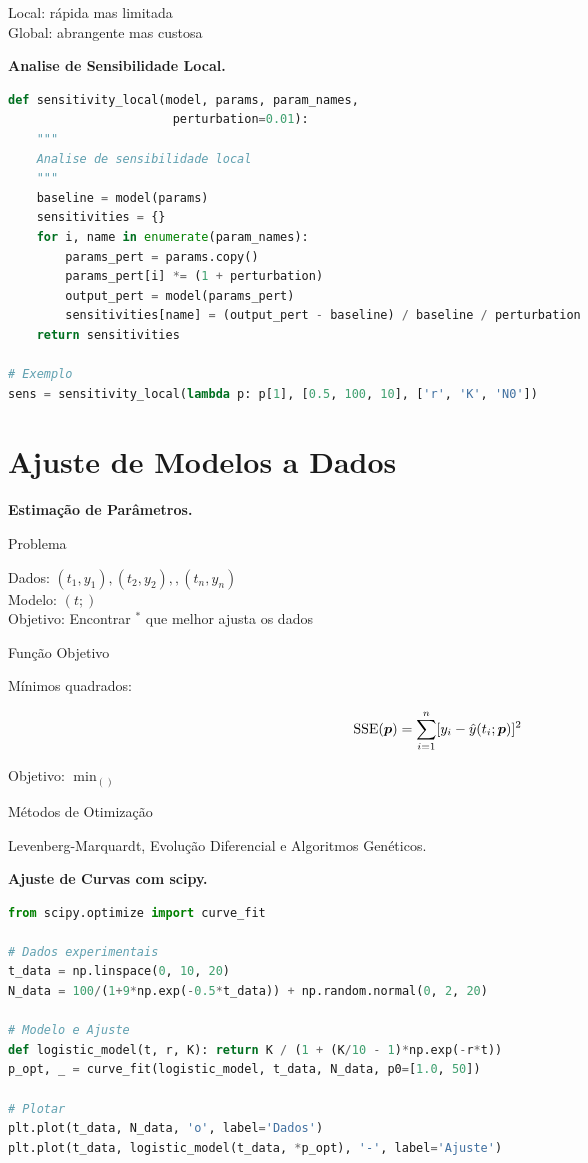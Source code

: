 Local: rápida mas limitada \\

Global: abrangente mas custosa

\textbf{Analise de Sensibilidade Local.}

%
\begin{lstlisting}[language=Python, caption=Sensibilidade por diferenças finitas, basicstyle=\ttfamily\footnotesize]
def sensitivity_local(model, params, param_names,
                       perturbation=0.01):
    """
    Analise de sensibilidade local
    """
    baseline = model(params)
    sensitivities = {}
    for i, name in enumerate(param_names):
        params_pert = params.copy()
        params_pert[i] *= (1 + perturbation)
        output_pert = model(params_pert)
        sensitivities[name] = (output_pert - baseline) / baseline / perturbation
    return sensitivities

# Exemplo
sens = sensitivity_local(lambda p: p[1], [0.5, 100, 10], ['r', 'K', 'N0'])
\end{lstlisting}
%

\section{Ajuste de Modelos a Dados}

\textbf{Estimação de Parâmetros.}

Problema

Dados: $(t_1, y_1), (t_2, y_2), , (t_n, y_n)$\\

Modelo: $(t; )$\\

Objetivo: Encontrar $^*$ que melhor ajusta os dados

Função Objetivo

Mínimos quadrados:

%
\begin{equation*}
\text{SSE}(\boldsymbol{p}) = \sum_{i=1}^{n} [y_i - \hat{y}(t_i; \boldsymbol{p})]^2
\end{equation*}
%

Objetivo: $\min_ ()$

Métodos de Otimização

Levenberg-Marquardt, Evolução Diferencial e Algoritmos Genéticos.

\textbf{Ajuste de Curvas com scipy.}

%
\begin{lstlisting}[language=Python, caption=Estimação de parâmetros, basicstyle=\ttfamily\footnotesize]
from scipy.optimize import curve_fit

# Dados experimentais
t_data = np.linspace(0, 10, 20)
N_data = 100/(1+9*np.exp(-0.5*t_data)) + np.random.normal(0, 2, 20)

# Modelo e Ajuste
def logistic_model(t, r, K): return K / (1 + (K/10 - 1)*np.exp(-r*t))
p_opt, _ = curve_fit(logistic_model, t_data, N_data, p0=[1.0, 50])

# Plotar
plt.plot(t_data, N_data, 'o', label='Dados')
plt.plot(t_data, logistic_model(t_data, *p_opt), '-', label='Ajuste')
\end{lstlisting}
%

